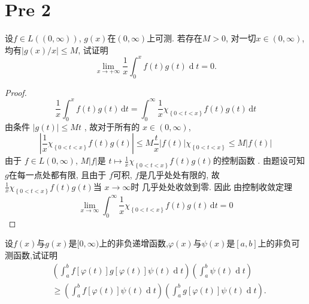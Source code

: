 \documentclass[../main.tex]{subfiles}
\begin{document}
\chapter{ Pre 2 }
\begin{exercise}{}{}
设$f\in L((0,\infty))$, $g(x)$在$(0,\infty)$上可测. 若存在$M>0$, 对一切$x\in(0,\infty)$, 均有$|g(x)/x|\leq M$, 试证明
\[
\lim_{x\to +\infty}\frac{1}{x}\int_{0}^{x}f(t)g(t)\operatorname{d}t=0.
\]
\end{exercise}
\begin{proof}
  \[
  \frac{1 }{x }\int_{0}^{x}f\left( t \right)g\left( t \right)\,\mathrm{d} t= \int_{0}^{\infty}\frac{1 }{x }\chi _{\left\{ 0< t< x\right\}}f\left( t \right)g\left( t \right)\,\mathrm{d} t      
  \]由条件 \(  \left| g\left(t \right)  \right|\le Mt   \) , 故对于所有的 \(  x\in \left( 0,\infty \right)   \), \[
  \left| \frac{1 }{x }\chi _{\left\{ 0<t< x  \right\}}  f\left( t \right)g\left( t \right)  \right|\le M\frac{t }{x }\left| f\left( t \right)  \right|   \chi _{\left\{ 0< t< x \right\}}\le M\left| f\left( t \right)  \right| 
  \] 由于 \(  f\in L\left( 0,\infty \right)   \),  \(  M\left| f \right|   \)是 \(  t\mapsto \frac{1 }{x }\chi _{\left\{ 0< t< x \right\}}f\left( t \right)g\left( t \right)     \)的控制函数 . 由题设可知 \(  g  \)在每一点处都有限, 且由于 \(  f  \)可积,  \(  f  \)是几乎处处有限的, 故 \( \frac{1 }{x }\chi _{\left\{ 0< t< x \right\}}f\left( t \right)g\left( t \right)   \)当 \(  x\to \infty  \)时 几乎处处收敛到零.  因此   由控制收敛定理   \[
  \lim_{x\to \infty}\int_{0}^{\infty}\frac{1 }{x }\chi _{\left\{ 0< t< x \right\}}f\left( t \right)g\left( t \right)\,\mathrm{d} t=0
  \]
\end{proof}
\begin{exercise}{}{}
    设\(f(x)\)与\(g(x)\)是\([0,\infty)\)上的非负递增函数,\(\varphi(x)\)与\(\psi(x)\)是\([a,b]\)上的非负可测函数,试证明
\[
\begin{aligned}
&\left(\int_a^b f[\varphi(t)]g[\varphi(t)]\psi(t)\operatorname{d}t\right)
\left(\int_a^b \psi(t)\operatorname{d}t\right)\\ 
 &
\ge
\left(\int_a^b f[\varphi(t)]\psi(t)\operatorname{d}t\right)
\left(\int_a^b g[\varphi(t)]\psi(t)\operatorname{d}t\right). 
\end{aligned}
\]
\end{exercise}
\end{document}
